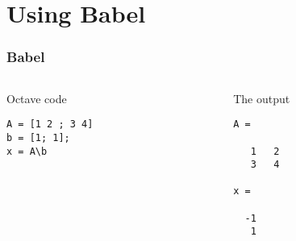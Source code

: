 \documentclass[bigger]{beamer}
\begin{document}
\section{Using Babel}
\label{sec-3}
\begin{frame}[fragile]
\frametitle{Babel}
\label{sec-3-1}
\begin{columns}
\begin{column}{0.45\textwidth}
\begin{block}{Octave code}
\label{sec-3-1-1}


\begin{verbatim}
A = [1 2 ; 3 4]
b = [1; 1];
x = A\b
\end{verbatim}
\end{block}
\end{column}
\begin{column}{0.4\textwidth}
\begin{block}{The output}
\label{sec-3-1-2}



\begin{verbatim}
A =

   1   2
   3   4

x =

  -1
   1
\end{verbatim}
\end{block}
\end{column}
\end{columns}
\end{frame}
\end{document}
